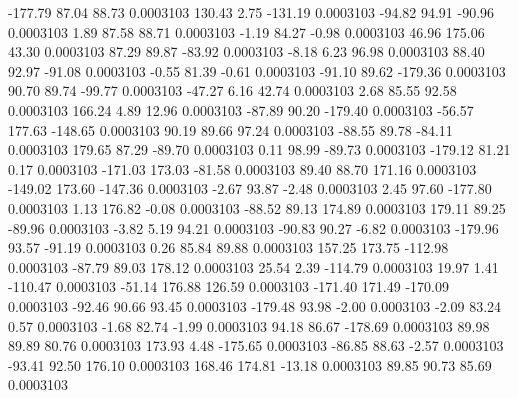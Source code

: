      -177.79       87.04       88.73     0.0003103
      130.43        2.75     -131.19     0.0003103
      -94.82       94.91      -90.96     0.0003103
        1.89       87.58       88.71     0.0003103
       -1.19       84.27       -0.98     0.0003103
       46.96      175.06       43.30     0.0003103
       87.29       89.87      -83.92     0.0003103
       -8.18        6.23       96.98     0.0003103
       88.40       92.97      -91.08     0.0003103
       -0.55       81.39       -0.61     0.0003103
      -91.10       89.62     -179.36     0.0003103
       90.70       89.74      -99.77     0.0003103
      -47.27        6.16       42.74     0.0003103
        2.68       85.55       92.58     0.0003103
      166.24        4.89       12.96     0.0003103
      -87.89       90.20     -179.40     0.0003103
      -56.57      177.63     -148.65     0.0003103
       90.19       89.66       97.24     0.0003103
      -88.55       89.78      -84.11     0.0003103
      179.65       87.29      -89.70     0.0003103
        0.11       98.99      -89.73     0.0003103
     -179.12       81.21        0.17     0.0003103
     -171.03      173.03      -81.58     0.0003103
       89.40       88.70      171.16     0.0003103
     -149.02      173.60     -147.36     0.0003103
       -2.67       93.87       -2.48     0.0003103
        2.45       97.60     -177.80     0.0003103
        1.13      176.82       -0.08     0.0003103
      -88.52       89.13      174.89     0.0003103
      179.11       89.25      -89.96     0.0003103
       -3.82        5.19       94.21     0.0003103
      -90.83       90.27       -6.82     0.0003103
     -179.96       93.57      -91.19     0.0003103
        0.26       85.84       89.88     0.0003103
      157.25      173.75     -112.98     0.0003103
      -87.79       89.03      178.12     0.0003103
       25.54        2.39     -114.79     0.0003103
       19.97        1.41     -110.47     0.0003103
      -51.14      176.88      126.59     0.0003103
     -171.40      171.49     -170.09     0.0003103
      -92.46       90.66       93.45     0.0003103
     -179.48       93.98       -2.00     0.0003103
       -2.09       83.24        0.57     0.0003103
       -1.68       82.74       -1.99     0.0003103
       94.18       86.67     -178.69     0.0003103
       89.98       89.89       80.76     0.0003103
      173.93        4.48     -175.65     0.0003103
      -86.85       88.63       -2.57     0.0003103
      -93.41       92.50      176.10     0.0003103
      168.46      174.81      -13.18     0.0003103
       89.85       90.73       85.69     0.0003103
